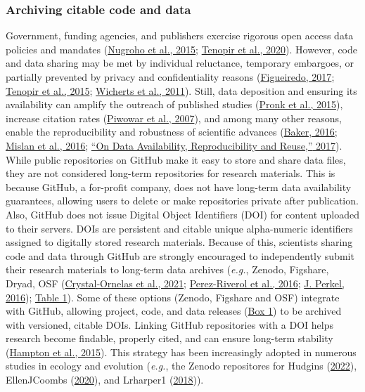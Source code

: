 \hypertarget{archiving-citable-code-and-data}{%
\subsubsection{Archiving citable code and data}\label{archiving-citable-code-and-data}}

Government, funding agencies, and publishers exercise rigorous open access data policies and mandates (\protect\hyperlink{ref-1Hcf13Q0k}{Nugroho et al., 2015}; \protect\hyperlink{ref-PLmDFZrm}{Tenopir et al., 2020}).
However, code and data sharing may be met by individual reluctance, temporary embargoes, or partially prevented by privacy and confidentiality reasons (\protect\hyperlink{ref-SLq38RVv}{Figueiredo, 2017}; \protect\hyperlink{ref-1CzUZwyU2}{Tenopir et al., 2015}; \protect\hyperlink{ref-1Ch6LSHef}{Wicherts et al., 2011}).
Still, data deposition and ensuring its availability can amplify the outreach of published studies (\protect\hyperlink{ref-666HppfO}{Pronk et al., 2015}), increase citation rates (\protect\hyperlink{ref-1CcAUn3Lu}{Piwowar et al., 2007}), and among many other reasons, enable the reproducibility and robustness of scientific advances (\protect\hyperlink{ref-1HZdsK5Kn}{Baker, 2016}; \protect\hyperlink{ref-uBJwnPbq}{Mislan et al., 2016}; \protect\hyperlink{ref-4LaijDIZ}{{``On Data Availability, Reproducibility and Reuse,''} 2017}).
While public repositories on GitHub make it easy to store and share data files, they are not considered long-term repositories for research materials.
This is because GitHub, a for-profit company, does not have long-term data availability guarantees, allowing users to delete or make repositories private after publication.
Also, GitHub does not issue Digital Object Identifiers (DOI) for content uploaded to their servers.
DOIs are persistent and citable unique alpha-numeric identifiers assigned to digitally stored research materials.
Because of this, scientists sharing code and data through GitHub are strongly encouraged to independently submit their research materials to long-term data archives (\emph{e.g.}, Zenodo, Figshare, Dryad, OSF (\protect\hyperlink{ref-1Du6fzB8g}{Crystal‐Ornelas et al., 2021}; \protect\hyperlink{ref-kEX5dgzK}{Perez-Riverol et al., 2016}; \protect\hyperlink{ref-10ghgV3S8}{J. Perkel, 2016}); \protect\hyperlink{tbl:compare}{Table 1}).
Some of these options (Zenodo, Figshare and OSF) integrate with GitHub, allowing project, code, and data releases (\protect\hyperlink{definitions}{Box 1}) to be archived with versioned, citable DOIs.
Linking GitHub repositories with a DOI helps research become findable, properly cited, and can ensure long-term stability (\protect\hyperlink{ref-iIEKCTLU}{Hampton et al., 2015}).
This strategy has been increasingly adopted in numerous studies in ecology and evolution (\emph{e.g.}, the Zenodo repositores for Hudgins (\protect\hyperlink{ref-GQj3c17f}{2022}), EllenJCoombs (\protect\hyperlink{ref-bZNn2hbh}{2020}), and Lrharper1 (\protect\hyperlink{ref-ZI1OqZNr}{2018})).

